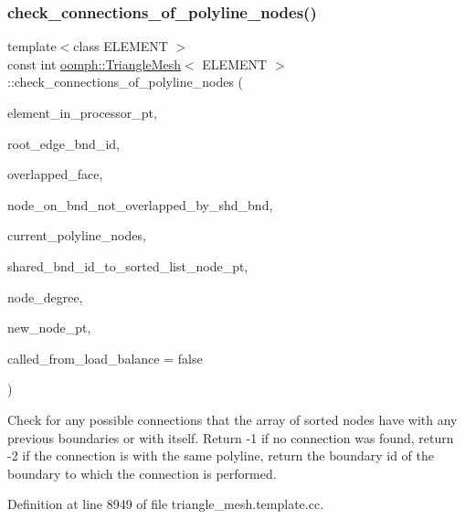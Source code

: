 \subsubsection{\texorpdfstring{check\+\_\+connections\+\_\+of\+\_\+polyline\+\_\+nodes()}{check\_connections\_of\_polyline\_nodes()}}
{\footnotesize\ttfamily template$<$class E\+L\+E\+M\+E\+NT $>$ \\
const int \hyperlink{classoomph_1_1TriangleMesh}{oomph\+::\+Triangle\+Mesh}$<$ E\+L\+E\+M\+E\+NT $>$\+::check\+\_\+connections\+\_\+of\+\_\+polyline\+\_\+nodes (\begin{DoxyParamCaption}\item[{std\+::set$<$ Finite\+Element $\ast$$>$ \&}]{element\+\_\+in\+\_\+processor\+\_\+pt,  }\item[{const int \&}]{root\+\_\+edge\+\_\+bnd\+\_\+id,  }\item[{std\+::map$<$ std\+::pair$<$ Node $\ast$, Node $\ast$$>$, bool $>$ \&}]{overlapped\+\_\+face,  }\item[{std\+::map$<$ unsigned, std\+::map$<$ Node $\ast$, bool $>$ $>$ \&}]{node\+\_\+on\+\_\+bnd\+\_\+not\+\_\+overlapped\+\_\+by\+\_\+shd\+\_\+bnd,  }\item[{std\+::list$<$ Node $\ast$$>$ \&}]{current\+\_\+polyline\+\_\+nodes,  }\item[{std\+::map$<$ unsigned, std\+::list$<$ Node $\ast$$>$ $>$ \&}]{shared\+\_\+bnd\+\_\+id\+\_\+to\+\_\+sorted\+\_\+list\+\_\+node\+\_\+pt,  }\item[{const unsigned \&}]{node\+\_\+degree,  }\item[{Node $\ast$\&}]{new\+\_\+node\+\_\+pt,  }\item[{const bool}]{called\+\_\+from\+\_\+load\+\_\+balance = {\ttfamily false} }\end{DoxyParamCaption})\hspace{0.3cm}{\ttfamily [protected]}}



Check for any possible connections that the array of sorted nodes have with any previous boundaries or with itself. Return -\/1 if no connection was found, return -\/2 if the connection is with the same polyline, return the boundary id of the boundary to which the connection is performed. 



Definition at line 8949 of file triangle\+\_\+mesh.\+template.\+cc.

\mbox{\label{classoomph_1_1TriangleMesh_a18322e3238acaf2c0d3c473b5fac4c91}} 
